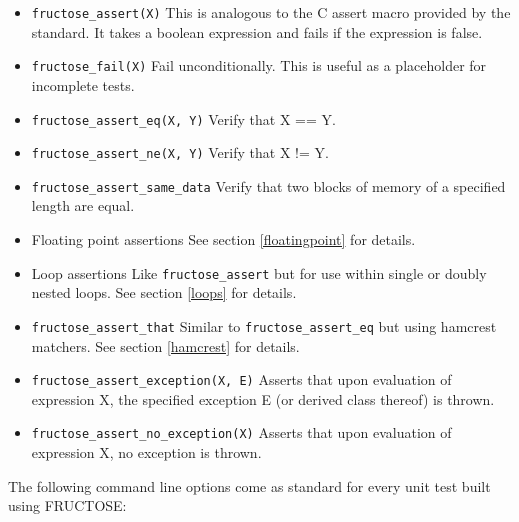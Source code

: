 \documentclass{book}
\begin{document}
\begin{itemize}
\item {\tt fructose\_assert(X)}\hfil\break
This is analogous to the C assert macro provided
by the standard. It takes a boolean expression and fails if the expression is false.

\item {\tt fructose\_fail(X)}\hfil\break
Fail unconditionally. This is useful as a placeholder for incomplete tests.

\item {\tt fructose\_assert\_eq(X, Y)}\hfil\break
Verify that X == Y.

\item {\tt fructose\_assert\_ne(X, Y)}\hfil\break
Verify that X != Y.

\item {\tt fructose\_assert\_same\_data}\hfil\break
Verify that two blocks of memory of a specified length are equal.

\item Floating point assertions\hfil\break
See section \ref{floatingpoint} for details.

\item Loop assertions\hfil\break
Like {\tt fructose\_assert} but for use within single or doubly nested loops. 
See section \ref{loops} for details.

\item {\tt fructose\_assert\_that}\hfil\break
Similar to {\tt fructose\_assert\_eq} but using hamcrest matchers. 
See section \ref{hamcrest} for details.

\item {\tt fructose\_assert\_exception(X, E)}\hfil\break
Asserts that upon evaluation of expression X,
the specified exception E (or derived class thereof) is thrown.

\item {\tt fructose\_assert\_no\_exception(X)}\hfil\break
Asserts that upon evaluation of expression X, no exception is thrown.

\end{itemize}

\label{command_line}

The following command line options come as standard
for every unit test built using FRUCTOSE:
\end{document}
